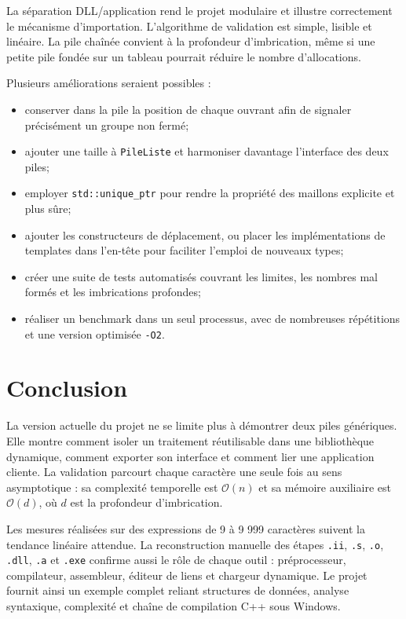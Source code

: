 \documentclass[11pt,a4paper]{article}
\newcommand{\fichier}[1]{\texttt{#1}}
\newcommand{\complexite}[1]{\ensuremath{\mathcal{O}(#1)}}
\begin{document}
La séparation DLL/application rend le projet modulaire et illustre correctement le mécanisme d'importation. L'algorithme de validation est simple, lisible et linéaire. La pile chaînée convient à la profondeur d'imbrication, même si une petite pile fondée sur un tableau pourrait réduire le nombre d'allocations.

Plusieurs améliorations seraient possibles :

\begin{itemize}
  \item conserver dans la pile la position de chaque ouvrant afin de signaler précisément un groupe non fermé;
  \item ajouter une taille à \texttt{PileListe} et harmoniser davantage l'interface des deux piles;
  \item employer \texttt{std::unique\_ptr} pour rendre la propriété des maillons explicite et plus sûre;
  \item ajouter les constructeurs de déplacement, ou placer les implémentations de templates dans l'en-tête pour faciliter l'emploi de nouveaux types;
  \item créer une suite de tests automatisés couvrant les limites, les nombres mal formés et les imbrications profondes;
  \item réaliser un benchmark dans un seul processus, avec de nombreuses répétitions et une version optimisée \texttt{-O2}.
\end{itemize}

\section{Conclusion}

La version actuelle du projet ne se limite plus à démontrer deux piles génériques. Elle montre comment isoler un traitement réutilisable dans une bibliothèque dynamique, comment exporter son interface et comment lier une application cliente. La validation parcourt chaque caractère une seule fois au sens asymptotique : sa complexité temporelle est \complexite{n} et sa mémoire auxiliaire est \complexite{d}, où $d$ est la profondeur d'imbrication.

Les mesures réalisées sur des expressions de 9 à 9 999 caractères suivent la tendance linéaire attendue. La reconstruction manuelle des étapes \fichier{.ii}, \fichier{.s}, \fichier{.o}, \fichier{.dll}, \fichier{.a} et \fichier{.exe} confirme aussi le rôle de chaque outil : préprocesseur, compilateur, assembleur, éditeur de liens et chargeur dynamique. Le projet fournit ainsi un exemple complet reliant structures de données, analyse syntaxique, complexité et chaîne de compilation C++ sous Windows.
\end{document}
